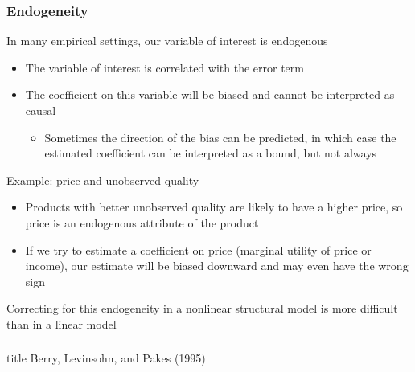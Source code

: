\documentclass{beamer}
\begin{document}
\begin{frame}\frametitle{Endogeneity}
    In many empirical settings, our variable of interest is endogenous
    \begin{itemize}
    	\item The variable of interest is correlated with the error term
        \item The coefficient on this variable will be biased and cannot be interpreted as causal
        \begin{itemize}
            \item Sometimes the direction of the bias can be predicted, in which case the estimated coefficient can be interpreted as a bound, but not always
        \end{itemize}
    \end{itemize}
    \vspace{2ex}
    Example: price and unobserved quality
    \begin{itemize}
    	\item Products with better unobserved quality are likely to have a higher price, so price is an endogenous attribute of the product
    	\item If we try to estimate a coefficient on price (marginal utility of price or income), our estimate will be biased downward and may even have the wrong sign
    \end{itemize}
    \vspace{2ex}
    Correcting for this endogeneity in a nonlinear structural model is more difficult than in a linear model
\end{frame}

\begin{frame}\frametitle{}
    \vfill
    \centering
    \begin{beamercolorbox}[center]{title}
        \Large Berry, Levinsohn, and Pakes (1995)
    \end{beamercolorbox}
    \vfill
\end{frame}
\end{document}
